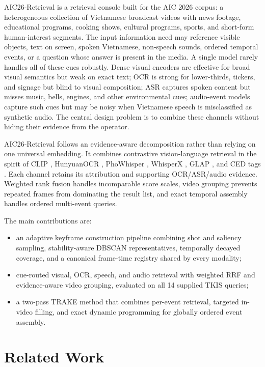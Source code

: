 \documentclass[conference]{IEEEtran}
\newcommand{\sys}{AIC26-Retrieval}
\begin{document}
\sys{} is a retrieval console built for the AIC 2026 corpus: a heterogeneous
collection of Vietnamese broadcast videos with news footage, educational
programs, cooking shows, cultural programs, sports, and short-form
human-interest segments. The input information need may reference visible objects, text on
screen, spoken Vietnamese, non-speech sounds, ordered temporal events, or a
question whose answer is present in the media. A single model rarely handles all
of these cues robustly. Dense visual encoders are effective for broad visual
semantics but weak on exact text; OCR is strong for lower-thirds, tickers, and
signage but blind to visual composition; ASR captures spoken content but misses
music, bells, engines, and other environmental cues; audio-event models capture
such cues but may be noisy when Vietnamese speech is misclassified as synthetic
audio. The central design problem is to combine these channels without hiding
their evidence from the operator.

\sys{} follows an evidence-aware decomposition rather than relying on one
universal embedding. It combines contrastive vision-language retrieval in the
spirit of CLIP \cite{radford2021clip}, HunyuanOCR \cite{hunyuanocr2025},
PhoWhisper \cite{le2024phowhisper}, WhisperX \cite{bain2023whisperx}, GLAP
\cite{dinkel2025glap}, and CED tags \cite{dinkel2023ced}. Each channel retains
its attribution and
supporting OCR/ASR/audio evidence. Weighted rank fusion handles incomparable
score scales, video grouping prevents repeated frames from dominating the
result list, and exact temporal assembly handles ordered multi-event queries.

The main contributions are:
\begin{itemize}
  \item an adaptive keyframe construction pipeline combining shot and saliency
  sampling, stability-aware DBSCAN representatives, temporally decayed coverage,
  and a canonical frame-time registry shared by every modality;
  \item cue-routed visual, OCR, speech, and audio retrieval with weighted RRF and
  evidence-aware video grouping, evaluated on all 14 supplied TKIS queries;
  \item a two-pass TRAKE method that combines per-event retrieval, targeted
  in-video filling, and exact dynamic programming for globally ordered event
  assembly.
\end{itemize}

\section{Related Work}
\end{document}
